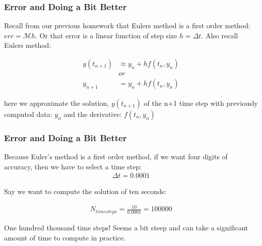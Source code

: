 \documentclass{beamer}
\begin{document}
\begin{frame}
\frametitle{Error and Doing a Bit Better}

Recall from our previous homework that Eulers method is a first order method: $err = \mathcal{M}h$. Or that error is a linear function of step size $ h=\Delta t$. Also recall 
Eulers method: 

\begin{align*}
y(t_{n+1})& \approx y_{n} + hf(t_n,y_n)\\
&or\\
y_{n+1} &= y_{n} + hf(t_n,y_n)
\end{align*}

here we approximate the solution, $y(t_{n+1})$ of the n+1 time step with previously computed data: $y_n$ and the derivative: $f(t_n,y_n)$ 


\end{frame}


\begin{frame}
\frametitle{Error and Doing a Bit Better}

Because Euler's method is a first order method, if we want four digits of accuracy, then we have to select a time step: 
\begin{align*}
\Delta t = 0.0001 
\end{align*}

Say we want to compute the solution of ten seconds: 

\begin{align*} 
N_{timesteps} = \frac{10}{0.0001} = 100000
\end{align*}

One hundred thousand time steps! Seems a bit steep and can take a significant amount of time to compute in practice. 
\end{frame}
\end{document}
